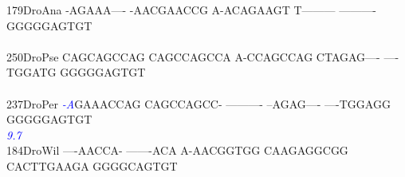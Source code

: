 \documentclass[11pt,twoside,reqno,a4paper]{article}
\begin{document}
{179\hspace*{1\charwidth}DroAna	-AGAAA----	-AACGAACCG	A-ACAGAAGT	T---------	----------	GGGGGAGTGT	\\
\hspace*{4\charwidth}\hspace*{7\charwidth}\hspace*{1\charwidth}\hspace*{1\charwidth}\hspace*{1\charwidth}\hspace*{1\charwidth}\hspace*{1\charwidth}\hspace*{1\charwidth}\\
250\hspace*{1\charwidth}DroPse	CAGCAGCCAG	CAGCCAGCCA	A-CCAGCCAG	CTAGAG----	----TGGATG	GGGGGAGTGT	\\
\hspace*{4\charwidth}\hspace*{7\charwidth}\hspace*{1\charwidth}\hspace*{1\charwidth}\hspace*{1\charwidth}\hspace*{1\charwidth}\hspace*{1\charwidth}\hspace*{1\charwidth}\\
237\hspace*{1\charwidth}DroPer	\textit{\textcolor{blue}{-}}\textit{\textcolor{blue}{A}}GAAACCAG	CAGCCAGCC-	----------	--AGAG----	----TGGAGG	GGGGGAGTGT	\\
\hspace*{4\charwidth}\hspace*{7\charwidth}\hspace*{0\charwidth}\textit{\textcolor{blue}{9.7}}\hspace*{1\charwidth}\hspace*{1\charwidth}\hspace*{1\charwidth}\hspace*{1\charwidth}\hspace*{1\charwidth}\hspace*{1\charwidth}\\
184\hspace*{1\charwidth}DroWil	----AACCA-	-------ACA	A-AACGGTGG	CAAGAGGCGG	CACTTGAAGA	GGGGCAGTGT	\\
\hspace*{4\charwidth}\hspace*{7\charwidth}\hspace*{1\charwidth}\hspace*{1\charwidth}\hspace*{1\charwidth}\hspace*{1\charwidth}\hspace*{1\charwidth}\hspace*{1\charwidth}\\
}
\end{document}
